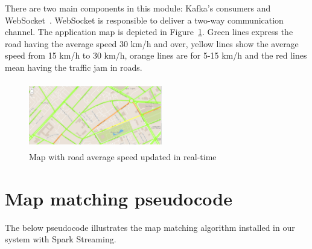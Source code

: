 \documentclass{sig-alternate-05-2015}
\begin{document}
There are two main components in this module: Kafka's consumers and WebSocket~\cite{websocket}. WebSocket is responsible to deliver a two-way communication channel. The application map is depicted in Figure~\ref{fig:app}. Green lines express the road having the average speed 30 km/h and over, yellow lines show the average speed from 15 km/h to 30 km/h, orange lines are for 5-15 km/h and the red lines mean having the traffic jam in roads. 

	\begin{figure}[h]
		\centering
		\includegraphics[height=110px,width=220px]{Picture1}
		\caption{Map with road average speed updated in real-time}
		\label{fig:app}
	\end{figure}


\section{Map matching pseudocode} 
\medskip
\noindent
The below pseudocode illustrates the map matching algorithm installed in our system with Spark Streaming. 
\end{document}

